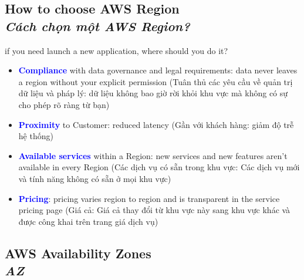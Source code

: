 \subsection[How to choose AWS Region?]{How to choose AWS Region\\
	\textit{Cách chọn một AWS Region?}}
if you need launch a new application, where should you do it?

\begin{itemize}
	\item \textcolor{blue}{\textbf{Compliance}} with data governance and legal requirements: data never leaves a region without your explicit permission (Tuân thủ các yêu cầu về quản trị dữ liệu và pháp lý: dữ liệu không bao giờ rời khỏi khu vực mà không có sự cho phép rõ ràng từ bạn)
	\item \textcolor{blue}{\textbf{Proximity}} to Customer: reduced latency (Gần với khách hàng: giảm độ trễ hệ thống)
	\item \textcolor{blue}{\textbf{Available services}} within a Region: new services and new features aren't available in every Region (Các dịch vụ có sẵn trong khu vực: Các dịch vụ mới và tính năng không có sẵn ở mọi khu vực)
	\item \textcolor{blue}{\textbf{Pricing}}: pricing varies region to region and is transparent in the service pricing page (Giá cả: Giá cả thay đổi từ khu vực này sang khu vực khác và được công khai trên trang giá dịch vụ)
\end{itemize}


\subsection[AWS Availability Zones]{AWS Availability Zones\\
	\textit{AZ}}
	
